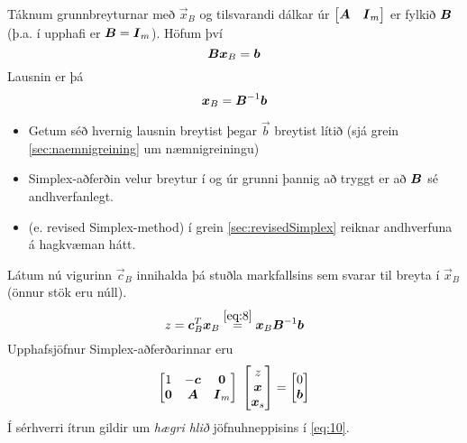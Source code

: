Táknum grunnbreyturnar með $\vec{x}_B$ og tilsvarandi dálkar úr $\begin{bmatrix}{\mbox{\boldmath$A$}} & {\mbox{\boldmath$I$}}_m\end{bmatrix}$ er fylkið ${\mbox{\boldmath$B$}}$ (þ.a. í upphafi er ${\mbox{\boldmath$B$}}={\mbox{\boldmath$I$}}_m$). 
Höfum því $$ {\mbox{\boldmath$B$}}{\mbox{\boldmath$x$}}_B={\mbox{\boldmath$b$}} $$
Lausnin er þá 
\begin{equation}
{\mbox{\boldmath$x$}}_B={\mbox{\boldmath$B$}}^{-1}{\mbox{\boldmath$b$}} \label{eq:8} 
\end{equation}
\begin{aths}\hspace{.1cm}
\begin{itemize}
\item Getum séð hvernig lausnin breytist þegar $\vec{b}$ breytist lítið (sjá grein \ref{sec:naemnigreining} um næmnigreiningu)
\item Simplex-aðferðin velur breytur í og úr grunni þannig að tryggt er að ${\mbox{\boldmath$B$}}$ sé andhverfanlegt.
\item {} (e. revised Simplex-method) í grein \ref{sec:revisedSimplex} reiknar andhverfuna á hagkvæman hátt.
\end{itemize} 
\end{aths}
Látum nú vigurinn $\vec{c}_B$ innihalda þá stuðla markfallsins sem svarar til breyta í $\vec{x}_B$ (önnur stök eru núll).
\begin{equation}
z={\mbox{\boldmath$c$}}_B^T{\mbox{\boldmath$x$}}_B \stackrel{\eqref{eq:8}}{=}{\mbox{\boldmath$x$}}_B{\mbox{\boldmath$B$}}^{-1}{\mbox{\boldmath$b$}} \label{eq:9}
\end{equation}
Upphafsjöfnur Simplex-aðferðarinnar eru
\begin{equation}
 \begin{bmatrix}  1 & -{\mbox{\boldmath$c$}} & {\mbox{\boldmath$0$}} \\ {\mbox{\boldmath$0$}} & {\mbox{\boldmath$A$}} & {\mbox{\boldmath$I$}}_m \end{bmatrix} \; \begin{bmatrix} z \\ {\mbox{\boldmath$x$}} \\ {\mbox{\boldmath$x$}}_s \end{bmatrix} = \begin{bmatrix} 0 \\ {\mbox{\boldmath$b$}} \end{bmatrix} \label{eq:10}
\end{equation}
Í sérhverri ítrun gildir um \emph{hægri hlið} jöfnuhneppisins í \eqref{eq:10}.
